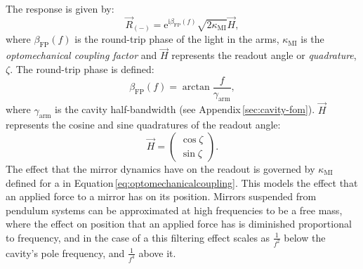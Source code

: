 The response is given by:
\begin{equation}
  \label{eq:fp-mich-response}
  \vec{R}_{\left( - \right)} = \text{e}^{\text{i} \beta_{\text{FP}} \left( f \right)} \sqrt{2 \kappa_{\text{MI}}} \vec{H},
\end{equation}
where $\beta_{\text{FP}} \left( f \right)$ is the round-trip phase of the light in the arms, $\kappa_{\text{MI}}$ is the \emph{optomechanical coupling factor} and $\vec{H}$ represents the readout angle or \emph{quadrature}, $\zeta$. The round-trip phase is defined:
\begin{equation}
  \beta_{\text{FP}} \left( f \right) = \arctan{\frac{f}{\gamma_{\text{arm}}}},
\end{equation}
where $\gamma_{\text{arm}}$ is the \FP{} cavity half-bandwidth (see Appendix\,\ref{sec:cavity-fom}). $\vec{H}$ represents the cosine and sine quadratures of the readout angle:
\begin{equation}
  \vec{H} =
  \begin{pmatrix}
    \cos \zeta \\
    \sin \zeta
  \end{pmatrix}.
\end{equation}
The effect that the mirror dynamics have on the readout is governed by $\kappa_{\text{MI}}$ defined for a \MI{} in Equation\,\ref{eq:optomechanicalcoupling}. This models the effect that an applied force to a mirror has on its position. Mirrors suspended from pendulum systems can be approximated at high frequencies to be a free mass, where the effect on position that an applied force has is diminished proportional to frequency, and in the case of a \FPMI{} this filtering effect scales as $\frac{1}{f^2}$ below the cavity's pole frequency, and $\frac{1}{f^4}$ above it.

